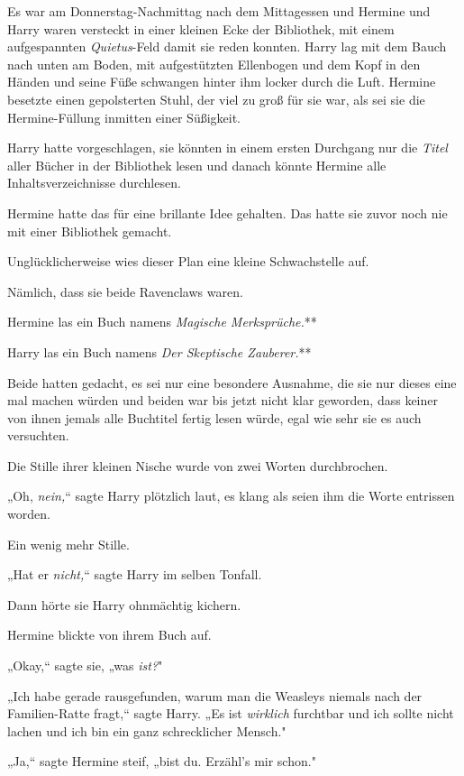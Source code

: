 {\hfill\break Es war am Donnerstag-Nachmittag nach dem Mittagessen und Hermine und Harry waren versteckt in einer kleinen Ecke der Bibliothek, mit einem aufgespannten \emph{Quietus}-Feld damit sie reden konnten. Harry lag mit dem Bauch nach unten am Boden, mit aufgestützten Ellenbogen und dem Kopf in den Händen und seine Füße schwangen hinter ihm locker durch die Luft. Hermine besetzte einen gepolsterten Stuhl, der viel zu groß für sie war, als sei sie die Hermine-Füllung inmitten einer Süßigkeit.

Harry hatte vorgeschlagen, sie könnten in einem ersten Durchgang nur die \emph{Titel} aller Bücher in der Bibliothek lesen und danach könnte Hermine alle Inhaltsverzeichnisse durchlesen.

Hermine hatte das für eine brillante Idee gehalten. Das hatte sie zuvor noch nie mit einer Bibliothek gemacht.

Unglücklicherweise wies dieser Plan eine kleine Schwachstelle auf.

Nämlich, dass sie beide Ravenclaws waren.

Hermine las ein Buch namens \emph{Magische Merksprüche.}**

Harry las ein Buch namens \emph{Der Skeptische Zauberer.}**

Beide hatten gedacht, es sei nur eine besondere Ausnahme, die sie nur dieses eine mal machen würden und beiden war bis jetzt nicht klar geworden, dass keiner von ihnen jemals alle Buchtitel fertig lesen würde, egal wie sehr sie es auch versuchten.

Die Stille ihrer kleinen Nische wurde von zwei Worten durchbrochen.

„Oh, \emph{nein,}“ sagte Harry plötzlich laut, es klang als seien ihm die Worte entrissen worden.

Ein wenig mehr Stille.

„Hat er \emph{nicht,}“ sagte Harry im selben Tonfall.

Dann hörte sie Harry ohnmächtig kichern.

Hermine blickte von ihrem Buch auf.

„Okay,“ sagte sie, „was \emph{ist?}"

„Ich habe gerade rausgefunden, warum man die Weasleys niemals nach der Familien-Ratte fragt,“ sagte Harry. „Es ist \emph{wirklich} furchtbar und ich sollte nicht lachen und ich bin ein ganz schrecklicher Mensch."

„Ja,“ sagte Hermine steif, „bist du. Erzähl's mir schon."

}
